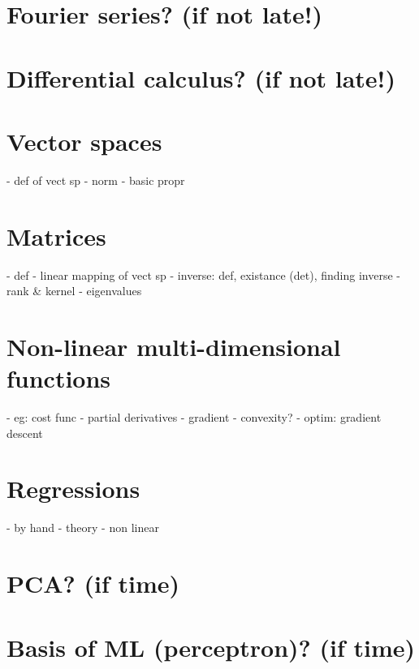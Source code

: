 \documentclass[11pt,a4paper]{article}
\begin{document}
\section{Fourier series? (if not late!)}
\section{Differential calculus? (if not late!)}

\section{Vector spaces}
- def of vect sp
- norm
- basic propr
\section{Matrices}
- def
- linear mapping of vect sp
- inverse: def, existance (det), finding inverse
- rank \& kernel
- eigenvalues

\section{Non-linear multi-dimensional functions}
- eg: cost func
- partial derivatives
- gradient
- convexity?
- optim: gradient descent
\section{Regressions}
- by hand
- theory
- non linear

\section{PCA? (if time)}
\section{Basis of ML (perceptron)? (if time)}
\end{document}
